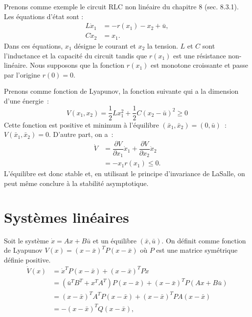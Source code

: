 
Prenons comme exemple le circuit RLC non linéaire du chapitre 8 (sec. 8.3.1). Les équations d'état sont :
\begin{equation*} \begin{split}
L \dot x_1 &= - r(x_1) - x_2 + \bar u, \\
C \dot x_2 &= x_1.
\end{split} \end{equation*}
Dans ces équations, $x_1$ désigne le courant et $x_2$ la tension. $L$ et $C$ sont l'inductance et la capacité du circuit tandis que $r(x_1)$ est une résistance non-linéaire. Nous supposons que la fonction $r(x_1)$ est monotone croissante et passe par l'origine $r(0)=0$.

Prenons comme fonction de Lyapunov, la fonction suivante qui a la dimension d'une énergie~:
 $$
 V(x_1, x_2) = \dfrac{1}{2}Lx_1^2+\dfrac{1}{2}C(x_2 -\bar u)^2 \geq 0
 $$
 Cette fonction est positive et minimum à l'équilibre $(\bar x_1, \bar x_2) =(0, \bar u)$~: $V(\bar x_1, \bar x_2) = 0$.
D'autre part, on a~:
\begin{equation*} \begin{split}
 \dot V &=  \dfrac{\partial V}{\partial x_1} \dot x_1 +
 \dfrac{\partial V}{\partial x_2} \dot x_2\\
 &= -x_1r(x_1) \leq 0.
\end{split} \end{equation*}
 L'équilibre est donc stable et, en utilisant le principe d'invariance de LaSalle, on peut même conclure à la stabilité asymptotique.\\

\section{Systèmes linéaires}

\noindent Soit le système $\dot x = Ax + B\bar u$ et un équilibre $(\bar x, \bar u)$. On définit comme fonction de Lyapunov $V(x) = (x-\bar x)^T P(x-\bar x)$ où
$P$ est une matrice symétrique définie positive.
\begin{equation*} \begin{split}
\dot V(x) &= \dot x^TP(x-\bar x) +(x-\bar x)^TP\dot x \\
&= (\bar u^TB^T+x^TA^T)P(x-\bar x) +(x-\bar x)^TP(Ax +B\bar u)\\
&= (x-\bar x)^TA^TP(x-\bar x) +(x-\bar x)^TP A(x-\bar x) \\
&= -(x-\bar x)^TQ(x-\bar x),
\end{split} \end{equation*}

